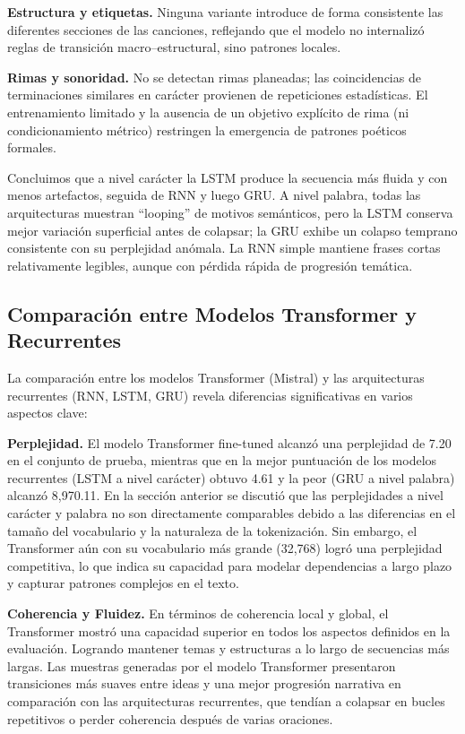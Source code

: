 \documentclass[paper=letter, fontsize=11pt, draft=false]{scrartcl}
\numberwithin{equation}{section} %
\numberwithin{figure}{section} %
\numberwithin{table}{section} %
\numberwithin{subsection}{section}
\begin{document}
\textbf{Estructura y etiquetas.} Ninguna variante introduce de forma consistente las diferentes secciones de las canciones, reflejando que el modelo no internalizó reglas de transición macro–estructural, sino patrones locales.

\textbf{Rimas y sonoridad.} No se detectan rimas planeadas; las coincidencias de terminaciones similares en carácter provienen de repeticiones estadísticas. El entrenamiento limitado y la ausencia de un objetivo explícito de rima (ni condicionamiento métrico) restringen la emergencia de patrones poéticos formales.

Concluimos que a nivel carácter la LSTM produce la secuencia más fluida y con menos artefactos, seguida de RNN y luego GRU. A nivel palabra, todas las arquitecturas muestran \/``looping'' de motivos semánticos, pero la LSTM conserva mejor variación superficial antes de colapsar; la GRU exhibe un colapso temprano consistente con su perplejidad anómala. La RNN simple mantiene frases cortas relativamente legibles, aunque con pérdida rápida de progresión temática.

\subsection{Comparación entre Modelos Transformer y Recurrentes}

La comparación entre los modelos Transformer (Mistral) y las arquitecturas recurrentes (RNN, LSTM, GRU) revela diferencias significativas en varios aspectos clave:

\textbf{Perplejidad.} El modelo Transformer fine-tuned alcanzó una perplejidad de 7.20 en el conjunto de prueba, mientras que en la mejor puntuación de los modelos recurrentes (LSTM a nivel carácter) obtuvo 4.61 y la peor (GRU a nivel palabra) alcanzó 8,970.11. En la sección anterior se discutió que las perplejidades a nivel carácter y palabra no son directamente comparables debido a las diferencias en el tamaño del vocabulario y la naturaleza de la tokenización. Sin embargo, el Transformer aún con su vocabulario más grande (32,768) logró una perplejidad competitiva, lo que indica su capacidad para modelar dependencias a largo plazo y capturar patrones complejos en el texto.

\textbf{Coherencia y Fluidez.} En términos de coherencia local y global, el Transformer mostró una capacidad superior en todos los aspectos definidos en la evaluación. Logrando mantener temas y estructuras a lo largo de secuencias más largas. Las muestras generadas por el modelo Transformer presentaron transiciones más suaves entre ideas y una mejor progresión narrativa en comparación con las arquitecturas recurrentes, que tendían a colapsar en bucles repetitivos o perder coherencia después de varias oraciones.
\end{document}
